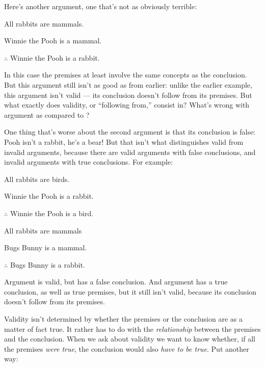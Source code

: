 Here's another argument, one that's not as obviously terrible:
\begin{earg}
\item[\ex{exarg2}]All rabbits are mammals.
\item[] Winnie the Pooh is a mammal.
\item[] $\therefore$ Winnie the Pooh is a rabbit.
\end{earg}
In this case the premises at least involve the same concepts as the conclusion.  But this argument still isn't as good as  from earlier: unlike the earlier example, this argument isn't valid --- its conclusion doesn't follow from its premises.  But what exactly does validity, or ``following from,'' consist in?  What's wrong with argument  as compared to ?

One thing that's worse about the second argument is that its conclusion is false: Pooh isn't a rabbit, he's a bear!  But that isn't what distinguishes valid from invalid arguments, because there are valid arguments with false conclusions, and invalid arguments with true conclusions.  For example:
\begin{earg}
\item[\ex{exarg3}]All rabbits are birds.
\item[] Winnie the Pooh is a rabbit.
\item[] $\therefore$ Winnie the Pooh is a bird.
\end{earg}

\begin{earg}
\item[\ex{exarg4}]All rabbits are mammals
\item[] Bugs Bunny is a mammal.
\item[] $\therefore$ Bugs Bunny is a rabbit.
\end{earg}
Argument  is valid, but has a false conclusion.  And argument  has a true conclusion, as well as true premises, but it still isn't valid, because its conclusion doesn't follow from its premises.  

Validity isn't determined by whether the premises or the conclusion are as a matter of fact true.  It rather has to do with the \emph{relationship} between the premises and the conclusion.  When we ask about validity we want to know whether, if all the premises \emph{were true}, the conclusion would also \emph{have to be true}.  Put another way:



